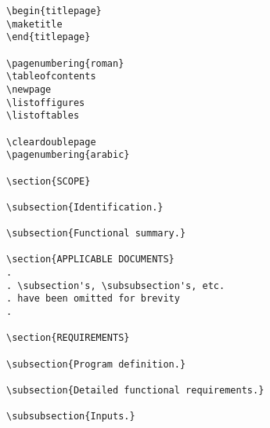 \begin{itemize}
\begin{small}
\begin{verbatim}
\begin{titlepage}
\maketitle
\end{titlepage}

\pagenumbering{roman}
\tableofcontents
\newpage
\listoffigures
\listoftables

\cleardoublepage
\pagenumbering{arabic}

\section{SCOPE}

\subsection{Identification.}

\subsection{Functional summary.}

\section{APPLICABLE DOCUMENTS}
.
. \subsection's, \subsubsection's, etc.
. have been omitted for brevity
.

\section{REQUIREMENTS}

\subsection{Program definition.}

\subsection{Detailed functional requirements.}

\subsubsection{Inputs.}


\end{verbatim}
\end{small}
\end{itemize}
